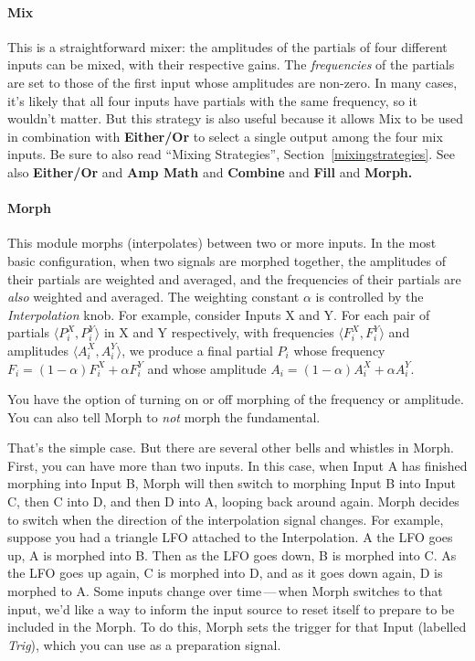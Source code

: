 \documentclass{article}
\begin{document}
\paragraph{Mix} This is a straightforward mixer: the amplitudes of the partials of four different inputs can be mixed, with their respective gains.  The {\it frequencies} of the partials are set to those of the first input whose amplitudes are non-zero.  In many cases, it's likely that all four inputs have partials with the same frequency, so it wouldn't matter.  But this strategy is also useful because it allows Mix to be used in combination with {\bf Either/Or} to select a single output among the four mix inputs.  Be sure to also read ``Mixing Strategies'', Section~\ref{mixingstrategies}.  See also {\bf Either/Or} and {\bf Amp Math} and {\bf Combine} and {\bf Fill} and {\bf Morph.}

\paragraph{Morph} This module morphs (interpolates) between two or more inputs.  In the most basic configuration, when two signals are morphed together, the amplitudes of their partials are weighted and averaged, and the frequencies of their partials are {\it also} weighted and averaged.  The weighting constant \(\alpha\) is controlled by the {\it Interpolation} knob.  For example, consider Inputs X and Y.  For each pair of partials \(\langle P^X_i, P^Y_i\rangle\) in X and Y respectively, with frequencies \(\langle F^X_i, F^Y_i\rangle\) and amplitudes \(\langle A^X_i, A^Y_i\rangle\), we produce a final partial \(P_i\) whose frequency \(F_i = (1-\alpha) F^X_i + \alpha F^Y_i\) and whose amplitude \(A_i = (1-\alpha) A^X_i + \alpha A^Y_i\).

You have the option of turning on or off morphing of the frequency or amplitude.  You can also tell Morph to {\it not} morph the fundamental.  

That's the simple case.  But there are several other bells and whistles in Morph.  First, you can have more than two inputs.  In this case, when Input A has finished morphing into Input B, Morph will then switch to morphing Input B into Input C, then C into D, and then D into A, looping back around again.  Morph decides to switch when the direction of the interpolation signal changes.  For example, suppose you had a triangle LFO attached to the Interpolation.  A the LFO goes up, A is morphed into B.  Then as the LFO goes down, B is morphed into C.  As the LFO goes up again, C is morphed into D, and as it goes down again, D is morphed to A.  Some inputs change over time\,---\,when Morph switches to that input, we'd like a way to inform the input source to reset itself to prepare to be included in the Morph.  To do this, Morph sets the trigger for that Input (labelled {\it Trig}), which you can use as a preparation signal.
\end{document}
